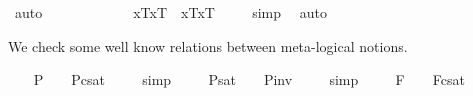 \begin{isabellebody}
\ auto%
\endisatagproof
{\isafoldproof}%
%
\isadelimproof
%
\endisadelimproof
\ \ \ \ \ \ \ \ \ \isanewline
\ \isamarkupfalse%
\ {\isachardoublequoteopen}{\isacharbrackleft}\isactrlbold {\isasymbox}{\isacharparenleft}\isactrlbold {\isasymforall}x{\isachardot}{\isasymlparr}{\isasymphi}\isactrlsup T{\isacharcomma}x\isactrlsup T{\isasymrparr}{\isacharparenright}\ \isactrlbold {\isasymrightarrow}\ {\isacharparenleft}\isactrlbold {\isasymforall}x{\isachardot}\isactrlbold {\isasymbox}{\isasymlparr}{\isasymphi}\isactrlsup T{\isacharcomma}x\isactrlsup T{\isasymrparr}{\isacharparenright}{\isacharbrackright}\ {\isacharequal}\ {\isasymtop}{\isachardoublequoteclose}%
\isadelimproof
\ %
\endisadelimproof
%
\isatagproof
{}\isamarkupfalse%
\ simp\ \isamarkupfalse%
\ auto%
\endisatagproof
{\isafoldproof}%
%
\isadelimproof
%
\endisadelimproof
%
\isamarkuptrue%
%
\begin{isamarkuptext}%
We check some well know relations between meta-logical notions.%
\end{isamarkuptext}\isamarkuptrue%
\ \isamarkupfalse%
\ \ {\isachardoublequoteopen}{\isacharbrackleft}{\isasymphi}\isactrlsup P{\isacharbrackright}\ {\isacharequal}\ {\isasymtop}\ {\isasymlongleftrightarrow}\ {\isacharbrackleft}{\isasymphi}\isactrlsup P{\isacharbrackright}\isactrlsup c\isactrlsup s\isactrlsup a\isactrlsup t\ {\isacharequal}\ {\isasymbottom}{\isachardoublequoteclose}%
\isadelimproof
\ %
\endisadelimproof
%
\isatagproof
{}\isamarkupfalse%
\ simp\ \isamarkupfalse%
%
\endisatagproof
{\isafoldproof}%
%
\isadelimproof
%
\endisadelimproof
\isanewline
\ \isamarkupfalse%
\ \ {\isachardoublequoteopen}{\isacharbrackleft}{\isasymphi}\isactrlsup P{\isacharbrackright}\isactrlsup s\isactrlsup a\isactrlsup t\ {\isacharequal}\ {\isasymtop}\ {\isasymlongleftrightarrow}\ {\isacharbrackleft}{\isasymphi}\isactrlsup P{\isacharbrackright}\isactrlsup i\isactrlsup n\isactrlsup v\ {\isacharequal}\ {\isasymbottom}{\isachardoublequoteclose}%
\isadelimproof
\ %
\endisadelimproof
%
\isatagproof
{}\isamarkupfalse%
\ simp\ \isamarkupfalse%
%
\endisatagproof
{\isafoldproof}%
%
\isadelimproof
%
\endisadelimproof
\isanewline
\ \isamarkupfalse%
\ \ {\isachardoublequoteopen}{\isacharbrackleft}{\isasymphi}\isactrlsup F{\isacharbrackright}\ {\isacharequal}\ {\isasymtop}\ {\isasymlongleftrightarrow}\ {\isacharbrackleft}{\isasymphi}\isactrlsup F{\isacharbrackright}\isactrlsup c\isactrlsup s\isactrlsup a\isactrlsup t\ {\isacharequal}\ {\isasymbottom}{\isachardoublequoteclose}%

\end{isabellebody}
